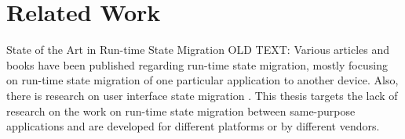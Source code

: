 \chapter{Related Work}
\label{ch:related}
State of the Art in Run-time State Migration
OLD TEXT: Various articles and books have been published regarding run-time state migration, mostly focusing on run-time state migration of one particular application to another device. Also, there is research on user interface state migration  \cite{migratory-interactive}. This thesis targets the lack of research on the work on run-time state migration between same-purpose applications and are developed for different platforms or by different vendors. 